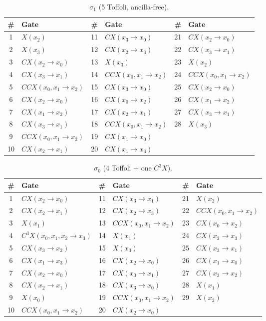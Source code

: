\documentclass[runningheads,10pt]{llncs}
\begin{document}
\begin{table}[htbp]
\centering
\caption{$\sigma_1$ (5 Toffoli, ancilla-free).}
\label{tab:sigma1-full-gates}
\small
\begin{tabular}{cl cl cl}
\toprule
\# & Gate & \# & Gate & \# & Gate \\
\midrule
1 & $X(x_2)$ & 11 & $CX(x_3\to x_0)$ & 21 & $CX(x_2\to x_0)$ \\
2 & $X(x_3)$ & 12 & $CX(x_2\to x_3)$ & 22 & $CX(x_3\to x_1)$ \\
3 & $CX(x_2\to x_0)$ & 13 & $X(x_3)$ & 23 & $X(x_2)$ \\
4 & $CX(x_3\to x_1)$ & 14 & $CCX(x_0,x_1\to x_2)$ & 24 & $CCX(x_0,x_1\to x_2)$ \\
5 & $CCX(x_0,x_1\to x_2)$ & 15 & $CX(x_3\to x_0)$ & 25 & $CX(x_2\to x_0)$ \\
6 & $CX(x_2\to x_0)$ & 16 & $CX(x_0\to x_2)$ & 26 & $CX(x_1\to x_2)$ \\
7 & $CX(x_1\to x_2)$ & 17 & $CX(x_2\to x_1)$ & 27 & $CX(x_3\to x_1)$ \\
8 & $CX(x_3\to x_1)$ & 18 & $CCX(x_0,x_1\to x_2)$ & 28 & $X(x_3)$ \\
9 & $CCX(x_0,x_1\to x_2)$ & 19 & $CX(x_1\to x_0)$ & & \\
10 & $CX(x_2\to x_1)$ & 20 & $CX(x_1\to x_3)$ & & \\
\bottomrule
\end{tabular}
\end{table}

\begin{table}[htbp]
\centering
\caption{$\sigma_0$ (4 Toffoli + one $C^3X$).}
\label{tab:sigma0-full-gates}
\small
\begin{tabular}{cl cl cl}
\toprule
\# & Gate & \# & Gate & \# & Gate \\
\midrule
1 & $CX(x_2\to x_0)$ & 11 & $CX(x_3\to x_1)$ & 21 & $X(x_2)$ \\
2 & $CX(x_2\to x_1)$ & 12 & $CX(x_2\to x_3)$ & 22 & $CCX(x_0,x_1\to x_2)$ \\
3 & $X(x_1)$ & 13 & $CCX(x_0,x_1\to x_2)$ & 23 & $CX(x_0\to x_2)$ \\
4 & $C^3X(x_0,x_1,x_2\to x_3)$ & 14 & $X(x_1)$ & 24 & $CX(x_2\to x_3)$ \\
5 & $CX(x_3\to x_2)$ & 15 & $X(x_3)$ & 25 & $CX(x_3\to x_1)$ \\
6 & $CX(x_1\to x_3)$ & 16 & $CX(x_2\to x_0)$ & 26 & $CX(x_1\to x_0)$ \\
7 & $CX(x_2\to x_0)$ & 17 & $CX(x_0\to x_1)$ & 27 & $CX(x_3\to x_2)$ \\
8 & $CX(x_2\to x_1)$ & 18 & $CX(x_3\to x_0)$ & 28 & $X(x_1)$ \\
9 & $X(x_0)$ & 19 & $CCX(x_0,x_1\to x_2)$ & 29 & $X(x_2)$ \\
10 & $CCX(x_0,x_1\to x_2)$ & 20 & $CX(x_2\to x_0)$ & & \\
\bottomrule
\end{tabular}
\end{table}
\end{document}
